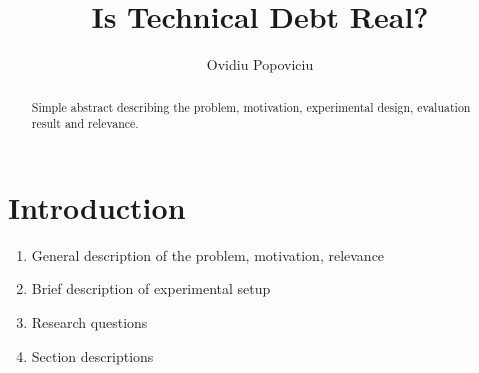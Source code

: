 \documentclass{mpaper}
\begin{document}
\title{Is Technical Debt Real?}
\author{Ovidiu Popoviciu}


\maketitle


\begin{abstract}
Simple abstract describing the problem, motivation, experimental design,
evaluation result and relevance.
\end{abstract}

\section{Introduction}
\label{introduction}

\begin{enumerate}
  \item General description of the problem, motivation, relevance
  \item Brief description of experimental setup 
  \item Research questions
  \item Section descriptions
\end{enumerate}


\end{document}
